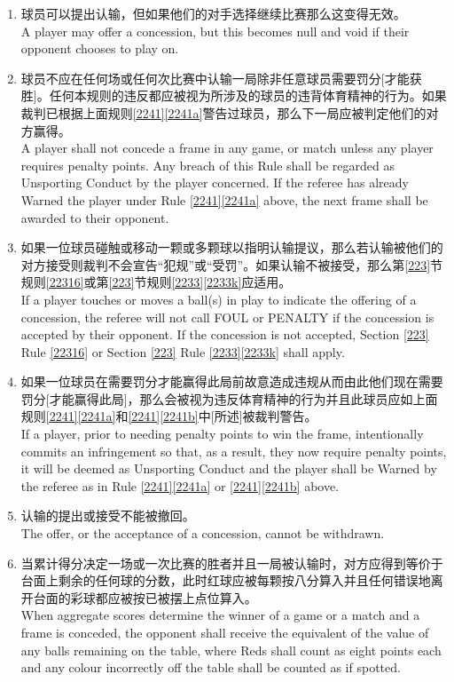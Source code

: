 \begin{enumerate}[label=(\alph*)]
    \item 球员可以提出认输，但如果他们的对手选择继续比赛那么这变得无效。\\
    A player may offer a concession, but this becomes null and void if their opponent chooses to play on.
    \item 球员不应在任何场或任何次比赛中认输一局除非任意球员需要罚分[才能获胜]。任何本规则的违反都应被视为所涉及的球员的违背体育精神的行为。如果裁判已根据上面规则\ref{2241}\ref{2241a}警告过球员，那么下一局应被判定他们的对方赢得。\\
    A player shall not concede a frame in any game, or match unless any player requires penalty points. Any breach of this Rule shall be regarded as Unsporting Conduct by the player concerned. If the referee has already Warned the player under Rule \ref{2241}\ref{2241a} above, the next frame shall be awarded to their opponent.
    \item \label{2242c}如果一位球员碰触或移动一颗或多颗球以指明认输提议，那么若认输被他们的对方接受则裁判不会宣告``犯规''或``受罚''。如果认输不被接受，那么第\ref{223}节规则\ref{22316}或第\ref{223}节规则\ref{2233}\ref{2233k}应适用。\\
    If a player touches or moves a ball(s) in play to indicate the offering of a concession, the referee will not call FOUL or PENALTY if the concession is accepted by their opponent. If the concession is not accepted, Section \ref{223} Rule \ref{22316} or Section \ref{223} Rule \ref{2233}\ref{2233k} shall apply.
    \item 如果一位球员在需要罚分才能赢得此局前故意造成违规从而由此他们现在需要罚分[才能赢得此局]，那么会被视为违反体育精神的行为并且此球员应如上面规则\ref{2241}\ref{2241a}和\ref{2241}\ref{2241b}中[所述]被裁判警告。\\
    If a player, prior to needing penalty points to win the frame, intentionally commits an infringement so that, as a result, they now require penalty points, it will be deemed as Unsporting Conduct and the player shall be Warned by the referee as in Rule \ref{2241}\ref{2241a} or \ref{2241}\ref{2241b} above.
    \item 认输的提出或接受不能被撤回。\\
    The offer, or the acceptance of a concession, cannot be withdrawn.
    \item 当累计得分决定一场或一次比赛的胜者并且一局被认输时，对方应得到等价于台面上剩余的任何球的分数，此时红球应被每颗按八分算入并且任何错误地离开台面的彩球都应被按已被摆上点位算入。\\
    When aggregate scores determine the winner of a game or a match and a frame is conceded, the opponent shall receive the equivalent of the value of any balls remaining on the table, where Reds shall count as eight points each and any colour incorrectly off the table shall be counted as if spotted.
\end{enumerate}

